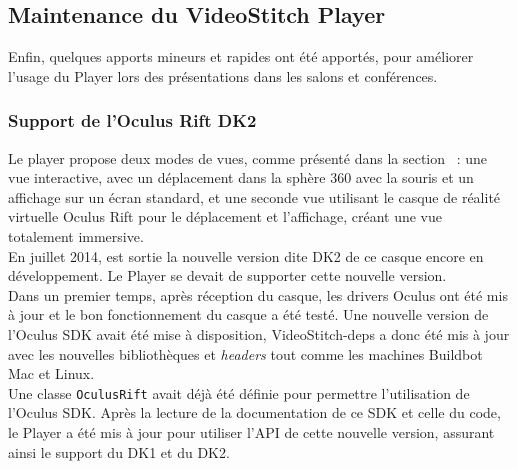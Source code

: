 \subsection{Maintenance du VideoStitch Player}
Enfin, quelques apports mineurs et rapides ont été apportés, pour améliorer l'usage
du Player lors des présentations dans les salons et conférences.
\subsubsection{Support de l'Oculus Rift DK2}
Le player propose deux modes de vues, comme présenté dans la section ~:
une vue interactive, avec un déplacement dans la sphère 360 avec la souris et un affichage
sur un écran standard, et une seconde vue utilisant le casque de réalité virtuelle 
Oculus Rift pour le déplacement et l'affichage, créant une vue totalement immersive.\\
En juillet 2014\cite{dk2s-now-shipping}, est sortie la nouvelle version dite DK2 de ce casque encore
en développement. Le Player se devait de supporter cette nouvelle version.\\
Dans un premier temps, après réception du casque, les drivers Oculus ont été mis à
jour et le bon fonctionnement du casque a été testé. Une nouvelle version de l'Oculus
SDK avait été mise à disposition, VideoStitch-deps a donc été mis à jour avec les nouvelles
bibliothèques et \textit{headers} tout comme les machines Buildbot Mac et Linux.\\
\newline
Une classe \texttt{OculusRift} avait déjà été définie pour permettre l'utilisation
de l'Oculus SDK. Après la lecture de la documentation de ce SDK et celle du code,
le Player a été mis à jour pour utiliser l'API de cette nouvelle version, assurant
ainsi le support du DK1 et du DK2.

